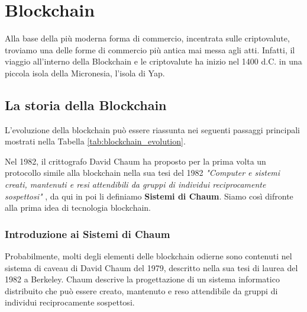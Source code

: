 \chapter{Blockchain}
\label{chap:blockchain}
Alla base della più moderna forma di commercio, incentrata sulle criptovalute, troviamo una delle forme di commercio più antica mai messa agli atti. Infatti, il viaggio all'interno della Blockchain e le criptovalute ha inizio nel 1400 d.C. in una piccola isola della Micronesia, l'isola di Yap.

\section{La storia della Blockchain}

L'evoluzione della blockchain può essere riassunta nei seguenti passaggi principali mostrati nella Tabella \ref{tab:blockchain_evolution}.

Nel 1982, il crittografo David Chaum ha proposto per la prima volta un protocollo simile alla blockchain nella sua tesi del 1982 \textit{"Computer e sistemi creati, mantenuti e resi attendibili da gruppi di individui reciprocamente sospettosi"} \cite{computer_systems_chaum}, da qui in poi li definiamo \textbf{Sistemi di Chaum}. Siamo così difronte alla prima idea di tecnologia blockchain.

\begin{table}[htbp]
  \centering
  \caption{Evoluzione della Blockchain}
  \label{tab:blockchain_evolution}
\end{table}

\subsection{Introduzione ai Sistemi di Chaum}
Probabilmente, molti degli elementi delle blockchain odierne sono contenuti nel sistema di caveau di David Chaum del 1979, descritto nella sua tesi di laurea del 1982 a Berkeley. Chaum descrive la progettazione di un sistema informatico distribuito che può essere creato, mantenuto e reso attendibile da gruppi di individui reciprocamente sospettosi.


